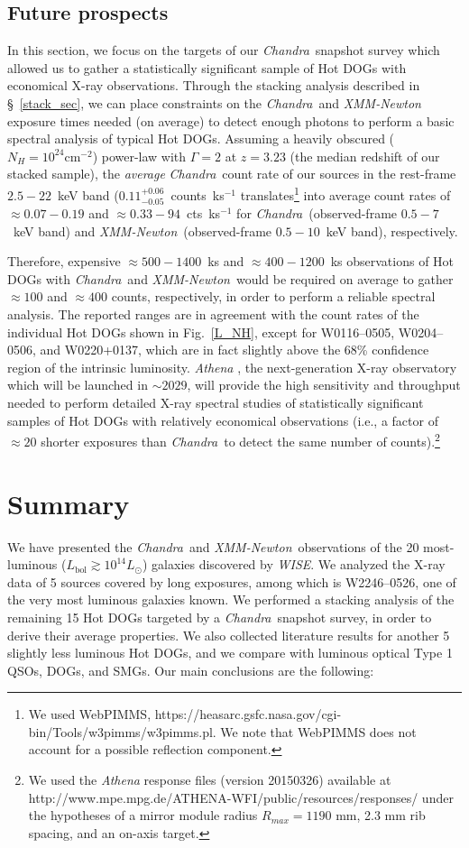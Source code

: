 \documentclass[useAMS,usenatbib]{mnras}
\newcommand*{\xmm}{\textit{\mbox{XMM-Newton}}}
\newcommand*{\chandra}{\textit{Chandra}}
\newcommand*{\nhunits}{\mathrm{cm^{-2}}}
\begin{document}
\subsection{Future prospects}
In this section, we focus on the targets of our \chandra\, snapshot survey which allowed us to gather a statistically significant sample of Hot DOGs with economical X-ray observations. Through the stacking analysis described in \S~\ref{stack_sec}, we can place constraints on the \chandra\, and \xmm\, exposure times needed (on average) to detect enough photons to perform a basic spectral analysis of typical Hot DOGs.
Assuming a heavily obscured ($N_H=10^{24}\nhunits$) power-law with $\Gamma=2$ at $z=3.23$ (the median redshift of our stacked sample), the \textit{average} \chandra\, count rate of our sources in the rest-frame $2.5-22$~keV band ($0.11^{+0.06}_{-0.05}$~counts~ks$^{-1}$ translates\footnote{We used WebPIMMS, https://heasarc.gsfc.nasa.gov/cgi-bin/Tools/w3pimms/w3pimms.pl. We note that WebPIMMS does not account for a possible reflection component.} into average count rates of $\approx0.07-0.19$ and $\approx0.33-94$~cts~ks$^{-1}$ for \chandra\, (observed-frame \mbox{$0.5-7$ keV} band) and \xmm\, (observed-frame \mbox{$0.5-10$ keV} band), respectively. 

Therefore, expensive $\approx500-1400$~ks and \mbox{$\approx400-1200$~ks} observations of Hot DOGs with \chandra\, and \xmm\, would be required on average to gather $\approx100$ and $\approx400$ counts, respectively, in order to perform a reliable spectral analysis. The reported ranges are in agreement with the count rates of the individual Hot DOGs shown in  Fig.~\ref{L_NH}, except for W0116--0505, W0204--0506, and W0220+0137, which are in fact slightly above the 68\% confidence region of the intrinsic luminosity.
 \textit{Athena} \citep{Nandra13}, the next-generation X-ray observatory which will be launched in $\sim2029$, will provide the high sensitivity and throughput needed to perform detailed X-ray spectral studies of statistically significant samples of Hot DOGs with relatively economical observations (i.e., a factor of $\approx20$ shorter exposures than \chandra\, to detect the same number of counts).\footnote{We used the \textit{Athena} response files (version 20150326) available at \mbox{http://www.mpe.mpg.de/ATHENA-WFI/public/resources/responses/} under the hypotheses of a mirror module radius $R_{max}=1190$ mm, 2.3 mm rib spacing, and an on-axis target.}


\section{Summary}
We  have presented the \chandra\, and \xmm\, observations of the 20 most-luminous ($L_{\mathrm{bol}}\gtrsim10^{14}L_\odot$) galaxies discovered by \textit{WISE}. We analyzed the X-ray data of 5 sources covered by long exposures, among which is W2246--0526, one of the very most luminous galaxies known. We performed a stacking analysis of the remaining 15 Hot DOGs targeted by a \chandra\, snapshot survey, in order to derive their average properties. We also collected literature results for another 5 slightly less luminous Hot DOGs, and we compare with luminous optical Type 1 QSOs, DOGs, and SMGs.
Our main conclusions are the following:
\end{document}
